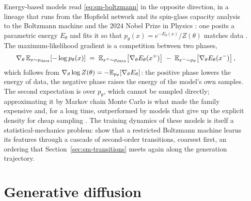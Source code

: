 Energy-based models read \eqref{eq:sm-boltzmann} in the opposite direction,
in a lineage that runs from the Hopfield network and its spin-glass capacity
analysis \citep{hopfield1982neural, amit1985storing, mezard1987spin} to the
Boltzmann machine \citep{ackley1985learning} and the 2024 Nobel Prize in
Physics \citep{nobel2024physics}: one posits a parametric energy $E_\theta$
and fits it so that $p_\theta(x) = e^{-E_\theta(x)}/Z(\theta)$ matches data
\citep{lecun2006tutorial}. The maximum-likelihood gradient is a competition
between two phases,
\begin{equation}
  \nabla_\theta\, \mathbb{E}_{x \sim p_{\mathrm{data}}}\!\left[-\log p_\theta(x)\right]
  \;=\;
  \mathbb{E}_{x^{+} \sim p_{\mathrm{data}}}\!\left[\nabla_\theta E_\theta(x^{+})\right]
  \;-\;
  \mathbb{E}_{x^{-} \sim p_{\theta}}\!\left[\nabla_\theta E_\theta(x^{-})\right],
  \label{eq:sm-ebm-grad}
\end{equation}
which follows from $\nabla_\theta \log Z(\theta) = -\mathbb{E}_{p_\theta}[\nabla_\theta
E_\theta]$: the positive phase lowers the energy of data, the negative phase
raises the energy of the model's own samples. The second expectation is over
$p_\theta$, which cannot be sampled directly; approximating it by Markov chain
Monte Carlo \citep{hinton2002training, robert2004monte} is what made the
family expensive and, for a long time, outperformed by models that give up the
explicit density for cheap sampling \citep{goodfellow2014generative,
kingma2014auto, papamakarios2021normalizing}. The training dynamics of these
models is itself a statistical-mechanics problem: \citet{bachtis2024cascade}
show that a restricted Boltzmann machine learns its features through a cascade
of second-order transitions, coarsest first, an ordering that
Section~\ref{sec:sm-transitions} meets again along the generation trajectory.

\section{Generative diffusion}
\label{sec:sm-diffusion}\label{sec:sm-relaxation}

